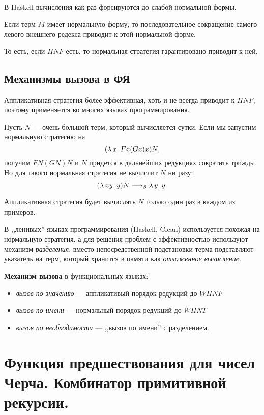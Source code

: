 \documentclass[11pt,a4paper]{article}
\begin{document}
В Haskell вычисления как раз форсируются до слабой нормальной формы.
\begin{thm}[о нормализации]
    Если терм $ M$ имеет нормальную форму, то последовательное сокращение самого левого внешнего редекса приводит к этой нормальной форме.
\end{thm}
То есть, если $HNF$ есть, то нормальная стратегия гарантировано приводит к ней.

\subsection{Механизмы вызова в ФЯ}
Аппликативная стратегия более эффективная, хоть и не всегда приводит к $ HNF$, поэтому применяется во многих языках программирования.

Пусть $ N$ --- очень большой терм, который вычисляется сутки.
Если мы запустим нормальную стратегию на 
\[
	(\lambda\,{x}.\:{Fx(Gx)x})N 
,\] 
получим $ FN(GN)N$ и  $ N$ придется в дальнейших редукциях сократить трижды.
Но для такого нормальная стратегия не вычислит $ N$ ни разу:
\[
	(\lambda\,{xy}.\:{y})N \longrightarrow_{\beta} \lambda\,{y}.\:{y}
.\] 

Аппликативная стратегия будет вычислять $ N$ только один раз в каждом из примеров.

В ,,ленивых'' языках программирования (Haskell, Clean) используется похожая на нормальную стратегия, а для решения проблем с эффективностью используют механизм \textit{разделения}: вместо непосредственной подстановки терма подставляют указатель на терм, который хранится в памяти как \textit{отложенное вычисление}.

\textbf{Механизм вызова} в функциональных языках:
\begin{itemize}
	\item \textit{вызов по значению} --- аппликативый порядок редукций до $ WHNF$ 
	\item \textit{вызов по имени} --- нормальный порядок редукций до $ WHNT$
	\item \textit{вызов по необходимости} --- ,,вызов по имени'' с разделением.
\end{itemize}


\section{Функция предшествования для чисел Черча. Комбинатор примитивной рекурсии.}
\end{document}
